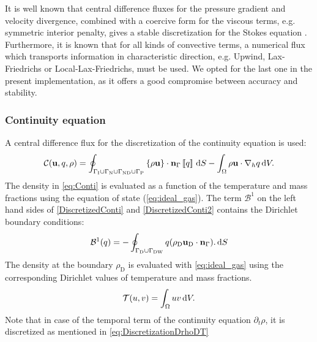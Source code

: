 It is well known that central difference fluxes for the pressure gradient and velocity divergence, combined with a coercive form for the viscous terms, e.g. symmetric interior penalty, gives a stable discretization for the Stokes equation \parencite{pietroMathematicalAspectsDiscontinuous2012,giraultDiscontinuousGalerkinMethod2004}. Furthermore, it is known that for all kinds of convective terms, a numerical flux which transports information in characteristic direction, e.g. Upwind, Lax-Friedrichs or Local-Lax-Friedrichs, must be used. We opted for the last one in the present implementation, as it offers a good compromise between accuracy and stability.
\subsubsection{Continuity equation}
A central difference flux for the discretization of the continuity equation is used:
\begin{equation}
	\mathcal{C}(\textbf{u},q, \rho)  =  \oint_{\Gamma_{\text{I}} \cup\Gamma_{\text{N}}\cup \Gamma_{\text{ND}}\cup \Gamma_{\text{P}}}{\left\{{\rho\textbf{u} }\right\}\cdot \textbf{n}_\Gamma\left[\!\left[{{q}}\right]\!\right] \,\mathrm{d} S} - \int_{\Omega}{\rho \textbf{u}\cdot \nabla_h q} \,\mathrm{d} V.  \label{eq:Conti}
\end{equation}
The density in \cref{eq:Conti} is evaluated as a function of the temperature and mass fractions using the equation of state (\cref{eq:ideal_gas}). The term $\mathcal{B}^1$ on the left hand sides of \cref{DiscretizedConti} and \cref{DiscretizedConti2}  contains the Dirichlet boundary conditions:
\begin{equation}
	\mathcal{B}^1(q) =  -\oint_{\Gamma_{\text{D}}\cup \Gamma_{\text{DW}}}{q(\rho_{\text{D}} \textbf{u}_{\text{D}} \cdot \textbf{n}_{\Gamma}). \,\mathrm{d} S}
\end{equation}
The density at the boundary  $\rho_{\text{D}}$ is evaluated with \cref{eq:ideal_gas} using the corresponding Dirichlet values of temperature and mass fractions.
\begin{equation}
\mathcal{T}(u,v) =   \int_{\Omega}{uv} \,\mathrm{d} V.
\end{equation}
Note that in case of the temporal term of the continuity equation $\partial_t \rho$, it is discretized as mentioned in \cref{eq:DiscretizationDrhoDT}
